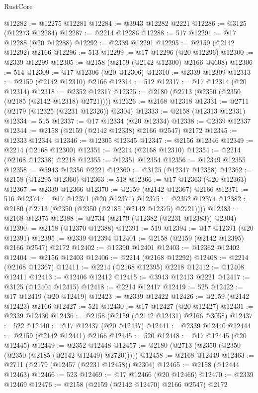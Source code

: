 \begin{lexlean}{RustCore}
\begin{coremodule}
@12282 := @12275 @12281
@12284 := @3943 @12282 @2221
@12286 := @3125 (@12273 @12284)
@12287 := @2214 @12286
@12288 := 517
@12291 := @17 @12288 (@20 @12288)
@12292 := @2339 @12291
@12295 := @2159 (@2142 @12292) @2166
@12296 := 513
@12299 := @17 @12296 (@20 @12296)
@12300 := @2339 @12299
@12305 := @2158 (@2159 (@2142 @12300) @2166 @4608)
@12306 := 514
@12309 := @17 @12306 (@20 @12306)
@12310 := @2339 @12309
@12313 := @2159 (@2142 @12310) @2166
@12314 := 512
@12317 := @17 @12314 (@20 @12314)
@12318 := @2352 @12317
@12325 := @2180 (@2713 (@2350 (@2350 (@2185 (@2142 @12318) @2721))))
@12326 := @2168 @12318
@12331 := @2711 (@2179 (@12325 (@2231 @12326)) @2304)
@12333 := @2158 (@12313 @12331)
@12334 := 515
@12337 := @17 @12334 (@20 @12334)
@12338 := @2339 @12337
@12344 := @2158 (@2159 (@2142 @12338) @2166 @2547) @2172
@12345 := @12333 @12344
@12346 := @12305 @12345
@12347 := @2156 @12346
@12349 := @2214 (@2168 @12300)
@12351 := @2214 (@2168 @12310)
@12354 := @2214 (@2168 @12338) @2218
@12355 := @12351 @12354
@12356 := @12349 @12355
@12358 := @3943 @12356 @2221
@12360 := @3125 (@12347 @12358)
@12362 := @2158 (@12295 @12360)
@12363 := 518
@12366 := @17 @12363 (@20 @12363)
@12367 := @2339 @12366
@12370 := @2159 (@2142 @12367) @2166
@12371 := 516
@12374 := @17 @12371 (@20 @12371)
@12375 := @2352 @12374
@12382 := @2180 (@2713 (@2350 (@2350 (@2185 (@2142 @12375) @2721))))
@12383 := @2168 @12375
@12388 := @2734 (@2179 (@12382 (@2231 @12383)) @2304)
@12390 := @2158 (@12370 @12388)
@12391 := 519
@12394 := @17 @12391 (@20 @12391)
@12395 := @2339 @12394
@12401 := @2158 (@2159 (@2142 @12395) @2166 @2547) @2172
@12402 := @12390 @12401
@12403 := @12362 @12402
@12404 := @2156 @12403
@12406 := @2214 (@2168 @12292)
@12408 := @2214 (@2168 @12367)
@12411 := @2214 (@2168 @12395) @2218
@12412 := @12408 @12411
@12413 := @12406 @12412
@12415 := @3943 @12413 @2221
@12417 := @3125 (@12404 @12415)
@12418 := @2214 @12417
@12419 := 525
@12422 := @17 @12419 (@20 @12419)
@12423 := @2339 @12422
@12426 := @2159 (@2142 @12423) @2166
@12427 := 521
@12430 := @17 @12427 (@20 @12427)
@12431 := @2339 @12430
@12436 := @2158 (@2159 (@2142 @12431) @2166 @3058)
@12437 := 522
@12440 := @17 @12437 (@20 @12437)
@12441 := @2339 @12440
@12444 := @2159 (@2142 @12441) @2166
@12445 := 520
@12448 := @17 @12445 (@20 @12445)
@12449 := @2352 @12448
@12457 := @2180 (@2713 (@2350 (@2350 (@2350 (@2185 (@2142 @12449) @2720)))))
@12458 := @2168 @12449
@12463 := @2711 (@2179 (@12457 (@2231 @12458)) @2304)
@12465 := @2158 (@12444 @12463)
@12466 := 523
@12469 := @17 @12466 (@20 @12466)
@12470 := @2339 @12469
@12476 := @2158 (@2159 (@2142 @12470) @2166 @2547) @2172

\end{coremodule}
\end{lexlean}
